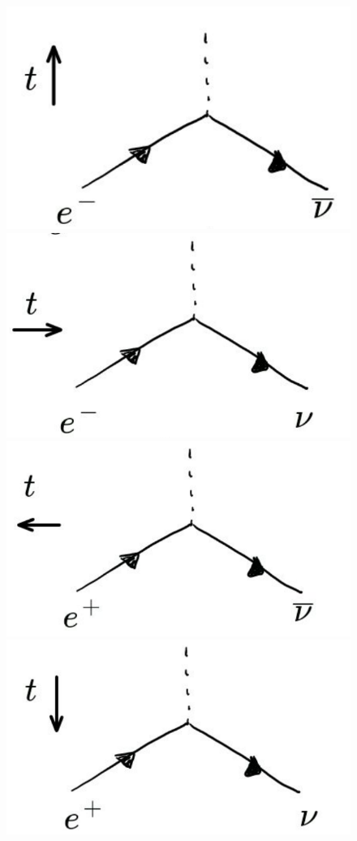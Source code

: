 \documentclass[12pt]{article}
\begin{document}
\begin{figure}[h]
\begin{center}
\includegraphics[scale=0.2]{images/FD_time1.png}
\includegraphics[scale=0.2]{images/FD_time2.png}
\includegraphics[scale=0.2]{images/FD_time3.png}
\includegraphics[scale=0.2]{images/FD_time4.png}

\end{center}
\end{figure}
\end{document}
